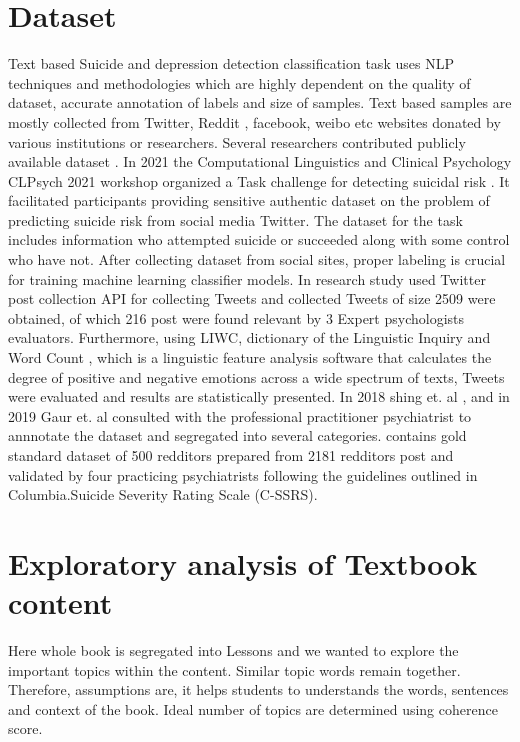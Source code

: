 \documentclass[sn-mathphys,Numbered]{sn-jnl}%
\theoremstyle{thmstyleone}%
\theoremstyle{thmstyletwo}%
\theoremstyle{thmstylethree}%
\begin{document}
\section{Dataset}
Text based Suicide and depression detection classification task uses NLP techniques and methodologies which are highly dependent on the quality of dataset, accurate annotation of labels and size of samples. Text based samples are mostly collected from Twitter, Reddit \cite{tadesse2019detection}, facebook, weibo etc websites donated by various institutions or researchers. Several researchers contributed publicly available dataset \cite{rissola2020dataset}. In 2021 the Computational Linguistics and Clinical Psychology CLPsych 2021 workshop organized a Task challenge for detecting suicidal risk \cite{macavaney2021community}. It facilitated participants providing sensitive authentic dataset on the problem of predicting suicide risk from social media Twitter. The dataset for the task includes information who attempted suicide or succeeded along with some control who have not. After collecting dataset from social sites, proper labeling is crucial for training machine learning classifier models. In\cite{lopez2022exploring} research study used Twitter post collection API for collecting Tweets and collected Tweets of size 2509 were obtained, of which 216 post were found relevant by 3 Expert psychologists evaluators. Furthermore, using LIWC, dictionary of the Linguistic Inquiry and Word Count \cite{pennebaker2001linguistic}, which is a linguistic feature analysis software that calculates the degree of positive and negative emotions across a wide spectrum of texts, Tweets were evaluated and results are statistically presented. In 2018 shing et. al \cite{shing2018expert}, and in 2019 Gaur et. al \cite{gaur2019knowledge} consulted with the professional practitioner psychiatrist to annnotate the dataset and segregated into several categories. \cite{gaur2019knowledge} contains gold standard dataset of 500 redditors prepared from 2181 redditors post and validated by four practicing psychiatrists following the guidelines outlined in Columbia.Suicide Severity Rating Scale (C-SSRS). 

\section{Exploratory analysis of Textbook content}

Here whole book is segregated into Lessons and we wanted to explore the important topics within the content. Similar topic words remain together. Therefore, assumptions are, it helps students to understands the words, sentences and context of the book. Ideal number of topics are determined using coherence score.
\end{document}
